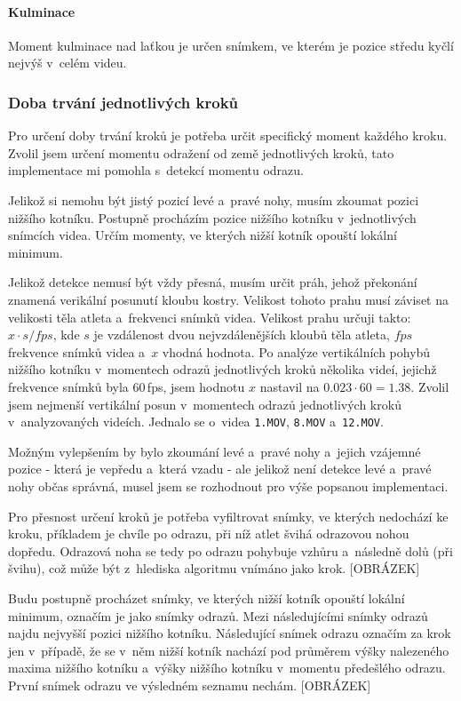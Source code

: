 \paragraph{Kulminace}

Moment kulminace nad laťkou je určen snímkem, ve kterém je pozice středu kyčlí nejvýš v~celém videu.


\subsubsection{Doba trvání jednotlivých kroků}

Pro určení doby trvání kroků je potřeba určit specifický moment každého kroku. Zvolil jsem určení momentu odražení od země jednotlivých kroků, tato implementace mi pomohla s~detekcí momentu odrazu.

Jelikož si nemohu být jistý pozicí levé a~pravé nohy, musím zkoumat pozici nižšího kotníku. Postupně procházím pozice nižšího kotníku v~jednotlivých snímcích videa. Určím momenty, ve kterých nižší kotník opouští lokální minimum.

Jelikož detekce nemusí být vždy přesná, musím určit práh, jehož překonání znamená verikální posunutí kloubu kostry. Velikost tohoto prahu musí záviset na velikosti těla atleta a~frekvenci snímků videa. Velikost prahu určuji takto: $x\cdot s/fps$, kde $s$ je vzdálenost dvou nejvzdálenějších kloubů těla atleta, $fps$ frekvence snímků videa a~$x$ vhodná hodnota. Po analýze vertikálních pohybů nižšího kotníku v~momentech odrazů jednotlivých kroků několika videí, jejichž frekvence snímků byla $60$\,\rm fps, jsem hodnotu $x$ nastavil na $0.023\cdot 60=1.38$. Zvolil jsem nejmenší vertikální posun v~momentech odrazů jednotlivých kroků v~analyzovaných videích. Jednalo se o~videa \texttt{1.MOV}, \texttt{8.MOV} a~\texttt{12.MOV}.

Možným vylepšením by bylo zkoumání levé a~pravé nohy a~jejich vzájemné pozice - která je vepředu a~která vzadu - ale jelikož není detekce levé a~pravé nohy občas správná, musel jsem se rozhodnout pro výše popsanou implementaci.

Pro přesnost určení kroků je potřeba vyfiltrovat snímky, ve kterých nedochází ke kroku, příkladem je chvíle po odrazu, při níž atlet švihá odrazovou nohou dopředu. Odrazová noha se tedy po odrazu pohybuje vzhůru a~následně dolů (při švihu), což může být z~hlediska algoritmu vnímáno jako krok. [OBRÁZEK]

Budu postupně procházet snímky, ve kterých nižší kotník opouští lokální minimum, označím je jako snímky odrazů. Mezi následujícími snímky odrazů najdu nejvyšší pozici nižšího kotníku. Následující snímek odrazu označím za krok jen v~případě, že se v~něm nižší kotník nachází pod průměrem výšky nalezeného maxima nižšího kotníku a~výšky nižšího kotníku v~momentu předešlého odrazu. První snímek odrazu ve výsledném seznamu nechám. [OBRÁZEK]

